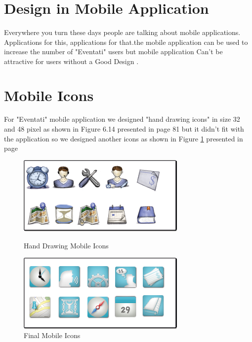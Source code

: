 \documentclass[12pt,a4paper,class,twoside,openany]{report}
\begin{document}
{\section{Design in Mobile Application}
\paragraph*{\hspace{.9 cm} } Everywhere you turn these days people are talking about mobile applications. Applications for this, applications for that.the mobile application can be used to increase the number of "Eventati" users but mobile application Can't be attractive for users without a Good Design .
\section{Mobile Icons}
\paragraph*{\hspace{.9 cm} } For "Eventati" mobile application we designed "hand drawing icons" in size 32 and 48 pixel as shown in Figure 6.14 presented in page 81 but it didn't fit with the application so we designed another icons as shown in Figure \ref{fg:6-15} presented in page \pageref{fg:6-15}
 \begin{figure}
	\begin{minipage}[b]{0.5\linewidth}
	\centering
	\includegraphics[height=1.20 in]{6-14}
	\caption{Hand Drawing Mobile Icons }
	\label{fg:6-13}
	\end{minipage}
	\hspace{0.5cm}
	\begin{minipage}[b]{0.5\linewidth}
	\centering
	\includegraphics[width=\textwidth]{6-15}
	\caption{Final Mobile Icons}
	\label{fg:6-15}
	\end{minipage}
	\end{figure}
}
\end{document}
